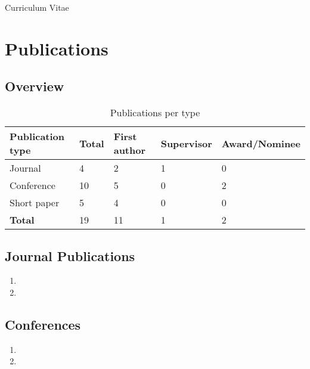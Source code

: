 \documentclass[11pt,a4paper]{article}
\begin{document}
\begin{cv}{Curriculum Vitae}
\begin{cvlist}{}
\end{cvlist}

%
\section{Publications}

\subsection{Overview}

\begin{table}[!ht]
\centering
\begin{tabular}{l|l|l|l|l}
\hline
Publication type     & Total & First author & Supervisor & Award/Nominee \\ \hline
Journal              & 4     & 2            & 1          & 0             \\ 
Conference           & 10    & 5            & 0          & 2             \\ 
Short paper          & 5     & 4            & 0          & 0             \\ \hline
\textbf{Total}       & 19    & 11           & 1          & 2             \\ \hline
\end{tabular}
\caption{Publications per type}
\end{table}

\subsection{Journal Publications}
\begin{cvlist}{}
    \item 
        \begin{enumerate}[leftmargin=-2cm]
            \item {}
            \item {}
        \end{enumerate}
\end{cvlist}
\subsection{Conferences}
\begin{cvlist}{}
    \item 
        \begin{enumerate}[resume,leftmargin=-2cm]
            \item {}
            \item {}
        \end{enumerate}
\end{cvlist}

\end{cv}
\end{document}
